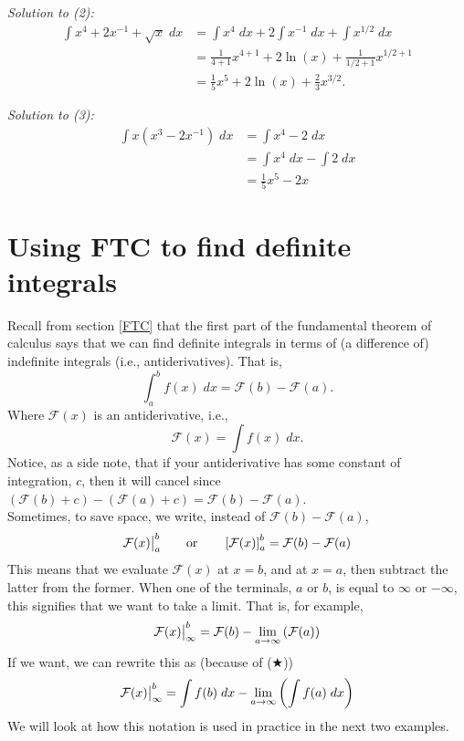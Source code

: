\noindent \textit{Solution to (2):} \\
\begin{align*}
\int x^4 + 2x^{-1} + \sqrt{x} \; dx & =  \int x^4 \; dx + 2\int x^{-1} \; dx + \int x^{1/2} \; dx \tag{linearity} \\
 		& = \frac{1}{4+1}x^{4+1} + 2\ln(x) + \frac{1}{1/2+1}x^{1/2+1} \tag{formulas}  \\
 		& = \frac{1}{5}x^5 + 2\ln(x) + \frac{2}{3}x^{3/2}.
\end{align*}

\noindent \textit{Solution to (3):} \\
\begin{align*}
\int x(x^3 - 2x^{-1}) \; dx & = \int x^4 - 2 \; dx \tag{expanding brackets} \\
	& = \int x^4 \; dx - \int 2 \; dx \\
	& = \frac{1}{5}x^5 - 2x \tag{formulas}
\end{align*}



\section{Using FTC to find definite integrals} \label{Using FTC to find definite integrals}
Recall from section \ref{FTC} that the first part of the fundamental theorem of calculus says that we can find definite integrals in terms of (a difference of) indefinite integrals (i.e., antiderivatives). That is, 
\[
\int_a^b f(x) \; dx = \mathcal{F}(b) - \mathcal{F}(a).
\]
Where $\mathcal{F}(x)$ is an antiderivative, i.e.,
\[
\mathcal{F}(x) = \int f(x) \; dx. \tag{$\bigstar$}
\]
Notice, as a side note, that if your antiderivative has some constant of integration, $c$, then it will cancel since $(\mathcal{F}(b) + c) - (\mathcal{F}(a) + c) =  \mathcal{F}(b) - \mathcal{F}(a)$. \\

\noindent Sometimes, to save space, we write, instead of $\mathcal{F}(b) - \mathcal{F}(a)$,
\[
\mathcal{F}(x)\big|_a^b \qquad \text{or} \qquad \left[\mathcal{F}(x)\right]_a^b = \mathcal{F}(b) - \mathcal{F}(a)
\]
This means that we evaluate $\mathcal{F}(x)$ at $x = b$, and at $x = a$, then subtract the latter from the former. When one of the terminals, $a$ or $b$, is equal to $\infty$ or $-\infty$, this signifies that we want to take a limit. That is, for example,
\[
\mathcal{F}(x)\big|_\infty^b =  \mathcal{F}(b) - \lim_{a \rightarrow \infty}\left(\mathcal{F}(a)\right)
\]
If we want, we can rewrite this as (because of ($\bigstar$)) 
\[
\mathcal{F}(x)\big|_\infty^b = \int f(b) \; dx - \lim_{a \rightarrow \infty}\left( \int f(a) \; dx\right)
\]
We will look at how this notation is used in practice in the next two examples.
